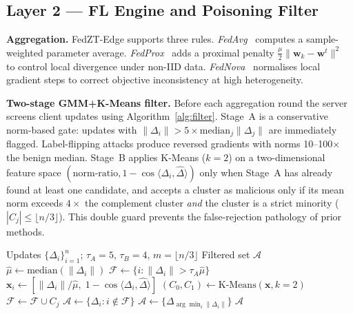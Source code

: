 \documentclass[iicol,sn-mathphys,Numbered]{sn-jnl}
\begin{document}
\subsection{Layer 2 --- FL Engine and Poisoning Filter}\label{sec:layer2}
\textbf{Aggregation.} FedZT-Edge supports three rules. \textit{FedAvg}~\cite{mcmahan2017} computes a sample-weighted parameter average. \textit{FedProx}~\cite{li2020fedprox} adds a proximal penalty $\tfrac{\mu}{2}\|\mathbf{w}_k-\mathbf{w}^t\|^2$ to control local divergence under non-IID data. \textit{FedNova}~\cite{wang2020fednova} normalises local gradient steps to correct objective inconsistency at high heterogeneity.

\textbf{Two-stage GMM+K-Means filter.} Before each aggregation round the server screens client updates using Algorithm~\ref{alg:filter}. Stage~A is a conservative norm-based gate: updates with $\|\Delta_i\| > 5\times\text{median}_j\|\Delta_j\|$ are immediately flagged. Label-flipping attacks produce reversed gradients with norms 10--100$\times$ the benign median. Stage~B applies K-Means ($k=2$) on a two-dimensional feature space $(\text{norm-ratio}, 1-\cos\langle\Delta_i,\hat\Delta\rangle)$ only when Stage~A has already found at least one candidate, and accepts a cluster as malicious only if its mean norm exceeds $4\times$ the complement cluster \emph{and} the cluster is a strict minority ($|C_j|\le\lfloor n/3\rfloor$). This double guard prevents the false-rejection pathology of prior methods.

\begin{algorithm}[t]
\caption{Two-Stage GMM+K-Means Update Filter}\label{alg:filter}
\begin{algorithmic}[1]
\Require Updates $\{\Delta_i\}_{i=1}^n$;\; $\tau_A{=}5$,\; $\tau_B{=}4$,\; $m{=}\lfloor n/3\rfloor$
\Ensure Filtered set $\mathcal{A}$
\State $\hat{\mu} \leftarrow \text{median}(\|\Delta_i\|)$
\State $\mathcal{F} \leftarrow \{i : \|\Delta_i\| > \tau_A\hat{\mu}\}$ 
  \State $\mathbf{x}_i\!\leftarrow\![\|\Delta_i\|/\hat\mu,\; 1{-}\cos\!\langle\Delta_i,\hat\Delta\rangle]$
  \State $(C_0,C_1)\!\leftarrow\!\text{K-Means}(\mathbf{x},k{=}2)$
      \State $\mathcal{F}\!\leftarrow\!\mathcal{F}\cup C_j$ 
    \EndIf
  \EndFor
\EndIf
\State $\mathcal{A}\!\leftarrow\!\{\Delta_i:i\notin\mathcal{F}\}$
 $\mathcal{A}\!\leftarrow\!\{\Delta_{\arg\min_i\|\Delta_i\|}\}$
\EndIf
\State\Return $\mathcal{A}$
\end{algorithmic}
\end{algorithm}
\end{document}
